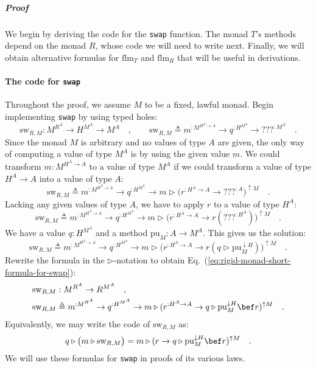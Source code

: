 \subparagraph{Proof}

We begin by deriving the code for the \lstinline!swap! function.
The monad $T$\textsf{'}s methods depend on the monad $R$, whose code we will
need to write next. Finally, we will obtain alternative formulas for
$\text{flm}_{T}$ and $\text{flm}_{R}$ that will be useful in derivations. 

\paragraph{The code for \texttt{swap}}

Throughout the proof, we assume $M$ to be a fixed, lawful monad.
Begin implementing \lstinline!swap! by using typed holes:
\[
\text{sw}_{R,M}:M^{R^{A}}\rightarrow H^{M^{A}}\rightarrow M^{A}\quad,\quad\quad\text{sw}_{R,M}\triangleq m^{:M^{H^{A}\rightarrow A}}\rightarrow q^{:H^{M^{A}}}\rightarrow\text{???}^{:M^{A}}\quad.
\]
Since the monad $M$ is arbitrary and no values of type $A$ are given,
the only way of computing a value of type $M^{A}$ is by using the
given value $m$. We could transform $m:M^{H^{A}\rightarrow A}$ to
a value of type $M^{A}$ if we could transform a value of type $H^{A}\rightarrow A$
into a value of type $A$:
\[
\text{sw}_{R,M}\triangleq m^{:M^{H^{A}\rightarrow A}}\rightarrow q^{:H^{M^{A}}}\rightarrow m\triangleright\big(r^{:H^{A}\rightarrow A}\rightarrow\text{???}^{:A}\big)^{\uparrow M}\quad.
\]
Lacking any given values of type $A$, we have to apply $r$ to a
value of type $H^{A}$:
\[
\text{sw}_{R,M}\triangleq m^{:M^{H^{A}\rightarrow A}}\rightarrow q^{:H^{M^{A}}}\rightarrow m\triangleright\big(r^{:H^{A}\rightarrow A}\rightarrow r(\text{???}^{:H^{A}})\big)^{\uparrow M}\quad.
\]
We have a value $q:H^{M^{A}}$ and a method $\text{pu}_{M}:A\rightarrow M^{A}$.
This gives us the solution:
\[
\text{sw}_{R,M}\triangleq m^{:M^{H^{A}\rightarrow A}}\rightarrow q^{:H^{M^{A}}}\rightarrow m\triangleright\big(r^{:H^{A}\rightarrow A}\rightarrow r(q\triangleright\text{pu}_{M}^{\downarrow H})\big)^{\uparrow M}\quad.
\]
Rewrite the formula in the $\triangleright$-notation to obtain Eq.~(\ref{eq:rigid-monad-short-formula-for-swap}):
\begin{align*}
 & \text{sw}_{R,M}:M^{R^{A}}\rightarrow R^{M^{A}}\quad,\\
 & \text{sw}_{R,M}\triangleq m^{:M^{R^{A}}}\rightarrow q^{:H^{M^{A}}}\rightarrow m\triangleright(r^{:H^{A}\rightarrow A}\rightarrow q\triangleright\text{pu}_{M}^{\downarrow H}\bef r)^{\uparrow M}\quad.
\end{align*}
Equivalently, we may write the code of $\text{sw}_{R,M}$ as:
\begin{equation}
q\triangleright\big(m\triangleright\text{sw}_{R,M}\big)=m\triangleright(r\rightarrow q\triangleright\text{pu}_{M}^{\downarrow H}\bef r)^{\uparrow M}\quad.\label{eq:rigid-monad-choice-swap-short}
\end{equation}
We will use these formulas for \lstinline!swap! in proofs of its
various laws.

